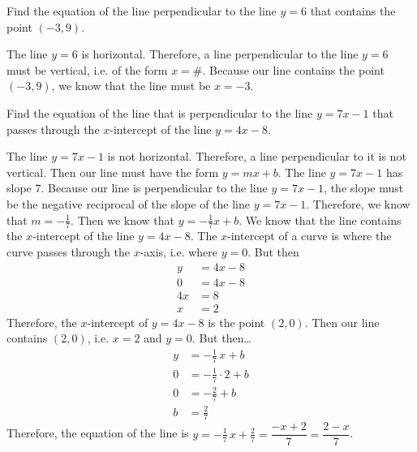 \documentclass[11pt,letterpaper]{article}
\begin{document}
\newpage





 Find the equation of the line perpendicular to the line $y= 6$ that contains the point $(-3, 9)$. \pspace

\sol The line $y= 6$ is horizontal. Therefore, a line perpendicular to the line $y= 6$ must be vertical, i.e. of the form $x= \#$. Because our line contains the point $(-3, 9)$, we know that the line must be $x= -3$. 





\newpage





 Find the equation of the line that is perpendicular to the line $y= 7x - 1$ that passes through the $x$-intercept of the line $y= 4x - 8$. \pspace

\sol The line $y= 7x - 1$ is not horizontal. Therefore, a line perpendicular to it is not vertical. Then our line must have the form $y= mx + b$. The line $y= 7x - 1$ has slope 7. Because our line is perpendicular to the line $y= 7x - 1$, the slope must be the negative reciprocal of the slope of the line $y= 7x - 1$. Therefore, we know that $m= -\frac{1}{7}$. Then we know that $y= -\frac{1}{7}x + b$. We know that the line contains the $x$-intercept of the line $y= 4x - 8$. The $x$-intercept of a curve is where the curve passes through the $x$-axis, i.e. where $y= 0$. But then
	\[
	\begin{aligned}
	y&= 4x - 8 \\
	0&= 4x - 8 \\
	4x&= 8 \\
	x&= 2
	\end{aligned}
	\]
Therefore, the $x$-intercept of $y= 4x - 8$ is the point $(2, 0)$. Then our line contains $(2, 0)$, i.e. $x= 2$ and $y= 0$. But then\dots
	\[
	\begin{aligned}
	y&= -\frac{1}{7}\,x + b \\
	0&= -\frac{1}{7} \cdot 2 + b \\
	0&= -\frac{2}{7} + b \\
	b&= \frac{2}{7}
	\end{aligned}
	\]
Therefore, the equation of the line is $y= -\frac{1}{7}\,x + \frac{2}{7}= \dfrac{-x + 2}{7}= \dfrac{2 - x}{7}$. 


\end{document}
